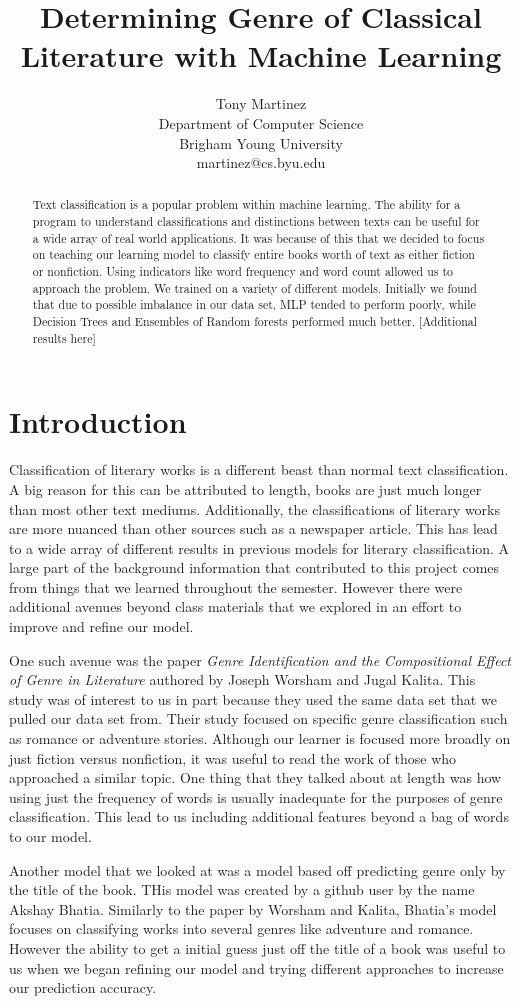 \documentclass{article}
\title{Determining Genre of Classical Literature with Machine Learning}
\author{Tony Martinez \\
Department of Computer Science\\
Brigham Young University \\
martinez@cs.byu.edu}
\begin{document}
\maketitle

\begin{abstract}
Text classification is a popular problem within machine learning. The ability for a program to understand classifications and distinctions between texts can be useful for a wide array of real world applications. It was because of this that we decided to focus on teaching our learning model to classify entire books worth of text as either fiction or nonfiction. Using indicators like word frequency and word count allowed us to approach the problem. We trained on a variety of different models. Initially we found that due to possible imbalance in our data set, MLP tended to perform poorly, while Decision Trees and Ensembles of Random forests performed much better. [Additional results here]
\end{abstract}

\section{Introduction}

Classification of literary works is a different beast than normal text classification. A big reason for this can be attributed to length, books are just much longer than most other text mediums. Additionally, the classifications of literary works are more nuanced than other sources such as a newspaper article. This has lead to a wide array of different results in previous models for literary classification. A large part of the background information that contributed to this project comes from things that we learned throughout the semester. However there were additional avenues beyond class materials that we explored in an effort to improve and refine our model. \par
One such avenue was the paper \textit{Genre Identification and the Compositional Effect of Genre in Literature} authored by Joseph Worsham and Jugal Kalita. This study was of interest to us in part because they used the same data set that we pulled our data set from. Their study focused on specific genre classification such as romance or adventure stories. Although our learner is focused more broadly on just fiction versus nonfiction, it was useful to read the work of those who approached a similar topic. One thing that they talked about at length was how using just the frequency of words is usually inadequate for the purposes of genre classification. This lead to us including additional features beyond a bag of words to our model. \par
Another model that we looked at was a model based off predicting genre only by the title of the book. THis model was created by a github user by the name Akshay Bhatia. Similarly to the paper by Worsham and Kalita, Bhatia’s model focuses on classifying works into several genres like adventure and romance. However the ability to get a initial guess just off the title of a book was useful to us when we began refining our model and trying different approaches to increase our prediction accuracy.
\pagebreak
\end{document}
